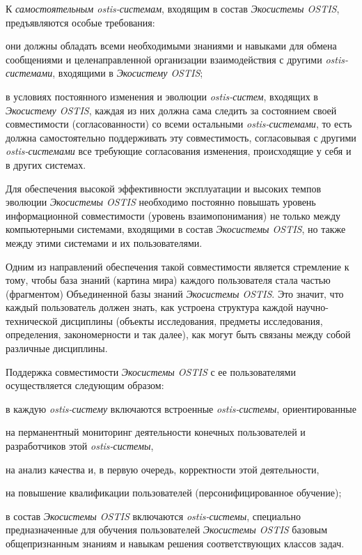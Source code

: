 К \textit{самостоятельным ostis-системам}, входящим в состав \textit{Экосистемы OSTIS}, предъявляются особые требования:
\begin{textitemize}
    \item они должны обладать всеми необходимыми знаниями и навыками для обмена сообщениями и целенаправленной организации взаимодействия с другими \textit{ostis-системами}, входящими в \textit{Экосистему OSTIS};
    \item в условиях постоянного изменения и эволюции \textit{ostis-систем}, входящих в \textit{Экосистему OSTIS}, каждая из них должна сама следить за состоянием своей совместимости (согласованности) со всеми остальными \textit{ostis-системами}, то есть должна самостоятельно поддерживать эту совместимость, согласовывая с другими \textit{ostis-системами} все требующие согласования изменения, происходящие у себя и в других системах.
\end{textitemize}

Для обеспечения высокой эффективности эксплуатации и высоких темпов эволюции \textit{Экосистемы OSTIS} необходимо постоянно повышать уровень информационной совместимости (уровень взаимопонимания) не только между компьютерными системами, входящими в состав \textit{Экосистемы OSTIS}, но также между этими системами и их пользователями. 

Одним из направлений обеспечения такой совместимости является стремление к тому, чтобы база знаний (картина мира) каждого пользователя стала частью (фрагментом) Объединенной базы знаний \textit{Экосистемы OSTIS}. Это значит, что каждый пользователь должен знать, как устроена структура каждой научно-технической дисциплины (объекты исследования, предметы исследования, определения, закономерности и так далее), как могут быть связаны между собой различные дисциплины.

Поддержка совместимости \textit{Экосистемы OSTIS} с ее пользователями осуществляется следующим образом:
\begin{textitemize}
    \item в каждую \textit{ostis-систему} включаются встроенные \textit{ostis-системы}, ориентированные
    \begin{textitemize}
        \item на перманентный мониторинг деятельности конечных пользователей и разработчиков этой \textit{ostis-системы},
        \item на анализ качества и, в первую очередь, корректности этой деятельности,
        \item на повышение квалификации пользователей (персонифицированное обучение);
    \end{textitemize}
    \item в состав \textit{Экосистемы OSTIS} включаются \textit{ostis-системы}, специально предназначенные для обучения пользователей \textit{Экосистемы OSTIS} базовым общепризнанным знаниям и навыкам решения соответствующих классов задач.
\end{textitemize}

